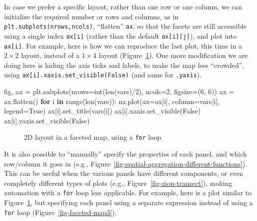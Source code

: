\documentclass[
  letterpaper,
]{krantz}
\newenvironment{Shaded}{\begin{snugshade}}{\end{snugshade}}
\newcommand{\BuiltInTok}[1]{\textcolor[rgb]{0.00,0.23,0.31}{#1}}
\newcommand{\ControlFlowTok}[1]{\textcolor[rgb]{0.00,0.23,0.31}{\textbf{#1}}}
\newcommand{\DecValTok}[1]{\textcolor[rgb]{0.68,0.00,0.00}{#1}}
\newcommand{\KeywordTok}[1]{\textcolor[rgb]{0.00,0.23,0.31}{\textbf{#1}}}
\newcommand{\NormalTok}[1]{\textcolor[rgb]{0.00,0.23,0.31}{#1}}
\newcommand{\OperatorTok}[1]{\textcolor[rgb]{0.37,0.37,0.37}{#1}}
\newcommand{\VariableTok}[1]{\textcolor[rgb]{0.07,0.07,0.07}{#1}}
\begin{document}
In case we prefer a specific layout, rather than one row or one column,
we can initialize the required number or rows and columns, as in
\texttt{plt.subplots(nrows,ncols)}, ``flatten'' \texttt{ax}, so that the
facets are still accessible using a single index \texttt{ax{[}i{]}}
(rather than the default \texttt{ax{[}i{]}{[}j{]}}), and plot into
\texttt{ax{[}i{]}}. For example, here is how we can reproduce the last
plot, this time in a \(2 \times 2\) layout, instead of a \(1 \times 4\)
layout (Figure~\ref{fig-faceted-map2}). One more modification we are
doing here is hiding the axis ticks and labels, to make the map less
``crowded'', using \texttt{ax{[}i{]}.xaxis.set\_visible(False)} (and
same for \texttt{.yaxis}).

\begin{Shaded}
\begin{Highlighting}[]
\NormalTok{fig, ax }\OperatorTok{=}\NormalTok{ plt.subplots(nrows}\OperatorTok{=}\BuiltInTok{int}\NormalTok{(}\BuiltInTok{len}\NormalTok{(}\BuiltInTok{vars}\NormalTok{)}\OperatorTok{/}\DecValTok{2}\NormalTok{), ncols}\OperatorTok{=}\DecValTok{2}\NormalTok{, figsize}\OperatorTok{=}\NormalTok{(}\DecValTok{6}\NormalTok{, }\DecValTok{6}\NormalTok{))}
\NormalTok{ax }\OperatorTok{=}\NormalTok{ ax.flatten()}
\ControlFlowTok{for}\NormalTok{ i }\KeywordTok{in} \BuiltInTok{range}\NormalTok{(}\BuiltInTok{len}\NormalTok{(}\BuiltInTok{vars}\NormalTok{)):}
\NormalTok{    nz.plot(ax}\OperatorTok{=}\NormalTok{ax[i], column}\OperatorTok{=}\BuiltInTok{vars}\NormalTok{[i], legend}\OperatorTok{=}\VariableTok{True}\NormalTok{)}
\NormalTok{    ax[i].set\_title(}\BuiltInTok{vars}\NormalTok{[i])}
\NormalTok{    ax[i].xaxis.set\_visible(}\VariableTok{False}\NormalTok{)}
\NormalTok{    ax[i].yaxis.set\_visible(}\VariableTok{False}\NormalTok{)}
\end{Highlighting}
\end{Shaded}

\begin{figure}[H]


\caption{\label{fig-faceted-map2}2D layout in a faceted map, using a
\texttt{for} loop}

\end{figure}%

It is also possible to ``manually'' specify the properties of each
panel, and which row/column it goes in (e.g.,
Figure~\ref{fig-spatial-aggregation-different-functions}). This can be
useful when the various panels have different components, or even
completely different types of plots (e.g.,
Figure~\ref{fig-zion-transect}), making automation with a \texttt{for}
loop less applicable. For example, here is a plot similar to
Figure~\ref{fig-faceted-map2}, but specifying each panel using a
separate expression instead of using a \texttt{for} loop
(Figure~\ref{fig-faceted-map3}).
\end{document}
